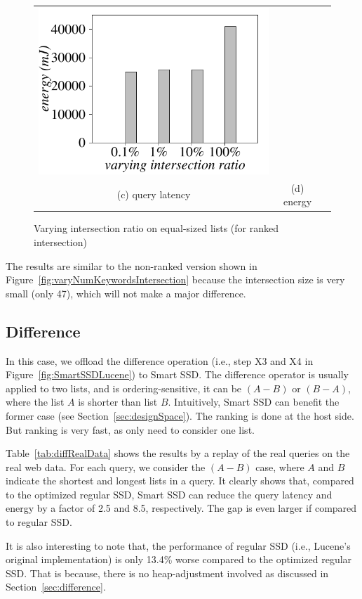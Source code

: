 \begin{figure}[tbp]
\begin{tabular}{ccc}
  \includegraphics[width=0.5\columnwidth]{figures/RankIntersection-energy-VaryInterRatio-equal1-eps-converted-to.pdf}\\
  (c) query latency & (d) energy
\end{tabular}
  \caption{Varying intersection ratio on equal-sized lists (for ranked intersection)}
  \label{fig:varyRankInterRatioIntersection2}
 \end{figure}


The results are similar to the non-ranked version shown in Figure~\ref{fig:varyNumKeywordsIntersection} because the intersection size is very small (only 47), which will not make a major difference.

\subsection{Difference}\label{sec:expDifference}

In this case, we offload the \textsf{difference} operation (i.e., step X3 and X4 in Figure~\ref{fig:SmartSSDLucene}) to Smart SSD. The \textsf{difference} operator is usually applied to two lists, and is ordering-sensitive, it can be $(A-B)$ or $(B-A)$, where the list $A$ is shorter than list $B$. Intuitively, Smart SSD can benefit the former case (see Section~\ref{sec:designSpace}). The ranking is done at the host side. But ranking is very fast, as only need to consider one list.

Table~\ref{tab:diffRealData} shows the results by a replay of the real queries on the real web data. For each query, we consider the $(A-B)$ case, where $A$ and $B$ indicate the shortest and longest lists in a query. It clearly shows that, compared to the optimized regular SSD, Smart SSD can reduce the query latency and energy by a factor of 2.5 and 8.5, respectively. The gap is even larger if compared to regular SSD.

It is also interesting to note that, the performance of regular SSD (i.e., Lucene's original implementation) is only 13.4\% worse compared to the optimized regular SSD. That is because, there is no heap-adjustment involved as discussed in Section~\ref{sec:difference}.

